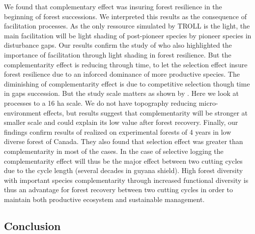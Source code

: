 \documentclass[12pt,]{article}
\theoremstyle{definition}
\theoremstyle{definition}
\theoremstyle{remark}
\begin{document}
We found that complementary effect was insuring forest resilience in the
beginning of forest successions. We interpreted this results as the
consequence of facilitation processes. As the only ressource simulated
by TROLL is the light, the main facilitation will be light shading of
post-pioneer species by pioneer species in disturbance gaps. Our results
confirm the study of \citet{Morin2011} who also highlighted the
importance of facilitation through light shading in forest resilience.
But the complementarity effect is reducing through time, to let the
selection effect insure forest resilience due to an inforced dominance
of more productive species. The diminishing of complementarity effect is
due to competitive selection though time in gaps succession. But the
study scale matters as shown by \citet{Chisholm2013}. Here we look at
processes to a 16 ha scale. We do not have topography reducing
micro-environment effects, but \citet{Chisholm2013} results suggest that
complementarity will be stronger at smaller scale and could explain its
low value after forest recovery. Finally, our findings confirm results
of \citet{Tobner2016} realized on experimental forests of 4 years in low
diverse forest of Canada. They also found that selection effect was
greater than complementarity in most of the cases. In the case of
selective logging the complementarity effect will thus be the major
effect between two cutting cycles due to the cycle length (several
decades in guyana shield). High forest diversity with important species
complementarity through increased functional diversity is thus an
advantage for forest recovery between two cutting cycles in order to
maintain both productive ecosystem and sustainable management.

\subsection{Conclusion}\label{conclusion}
\end{document}
